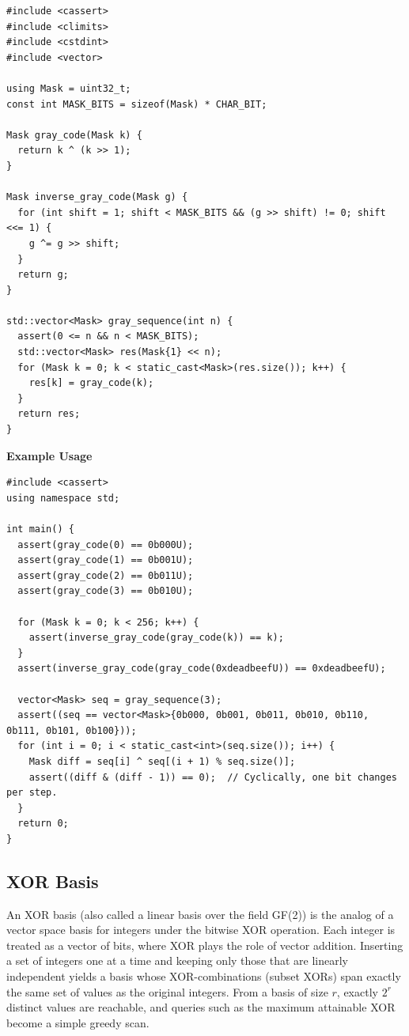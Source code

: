 \begin{lstlisting}[style=cpp]
#include <cassert>
#include <climits>
#include <cstdint>
#include <vector>

using Mask = uint32_t;
const int MASK_BITS = sizeof(Mask) * CHAR_BIT;

Mask gray_code(Mask k) {
  return k ^ (k >> 1);
}

Mask inverse_gray_code(Mask g) {
  for (int shift = 1; shift < MASK_BITS && (g >> shift) != 0; shift <<= 1) {
    g ^= g >> shift;
  }
  return g;
}

std::vector<Mask> gray_sequence(int n) {
  assert(0 <= n && n < MASK_BITS);
  std::vector<Mask> res(Mask{1} << n);
  for (Mask k = 0; k < static_cast<Mask>(res.size()); k++) {
    res[k] = gray_code(k);
  }
  return res;
}
\end{lstlisting}
\textbf{Example Usage}\par
\begin{lstlisting}[style=cpp]
#include <cassert>
using namespace std;

int main() {
  assert(gray_code(0) == 0b000U);
  assert(gray_code(1) == 0b001U);
  assert(gray_code(2) == 0b011U);
  assert(gray_code(3) == 0b010U);

  for (Mask k = 0; k < 256; k++) {
    assert(inverse_gray_code(gray_code(k)) == k);
  }
  assert(inverse_gray_code(gray_code(0xdeadbeefU)) == 0xdeadbeefU);

  vector<Mask> seq = gray_sequence(3);
  assert((seq == vector<Mask>{0b000, 0b001, 0b011, 0b010, 0b110, 0b111, 0b101, 0b100}));
  for (int i = 0; i < static_cast<int>(seq.size()); i++) {
    Mask diff = seq[i] ^ seq[(i + 1) % seq.size()];
    assert((diff & (diff - 1)) == 0);  // Cyclically, one bit changes per step.
  }
  return 0;
}
\end{lstlisting}
\subsection{XOR Basis}
\label{sec:1.7.5}
An XOR basis (also called a linear basis over the field GF(2)) is the analog of a vector space basis for integers under the bitwise XOR operation. Each integer is treated as a vector of bits, where XOR plays the role of vector addition. Inserting a set of integers one at a time and keeping only those that are linearly independent yields a basis whose XOR-combinations (subset XORs) span exactly the same set of values as the original integers. From a basis of size $r$, exactly $2^r$ distinct values are reachable, and queries such as the maximum attainable XOR become a simple greedy scan.


